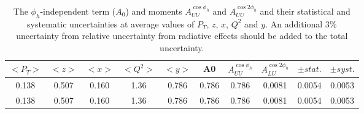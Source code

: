 \documentclass[aps,prl,twocolumn,showpacs,superscriptaddress,groupedaddress]{revtex4-1}  %
\newcommand{\xbj}{x}
\begin{document}
\begin{table}[ht]
  \begin{center}	
    \begin{tabular}{|c|c|c|c|c||c||c||c|c|c|}
       \hline	
	  {$<P_T>$} & {$<z>$} & {$<\xbj >$} & {$<Q^2 >$} & {$<y>$} & A0 & {$A^{\cos\phi_h}_{UU}$} & {$A^{\cos 2\phi_h}_{LU}$} & {$\pm stat.$}  & {$\pm syst.$}\\
	  \hline 
	    \hline 
{0.138 } &  {0.507} & {0.160} & {1.36} & {0.786} & {0.786} & {0.786} & {0.0081} &  {0.0054} & {0.0053}\\
{0.138 } &  {0.507} & {0.160} & {1.36} & {0.786} & {0.786} & {0.786} & {0.0081} &  {0.0054} & {0.0053}\\
	  \hline
    \end{tabular}	
    \caption{The $\phi_h$-independent term ($A_0$) and  moments $A^{\cos \phi_h}_{UU}$ and  $A^{\cos 2\phi_h}_{UU}$ and their statistical and systematic uncertainties at average values of $P_T$, $z$, $\xbj$, $Q^2$ and $y$. An additional 3\% uncertainty from relative uncertainty from radiative effects should be added to the total uncertainty.} 
    \label{aluxbtb}
  \end{center}	
\end{table}
%
%

%

\end{document}
